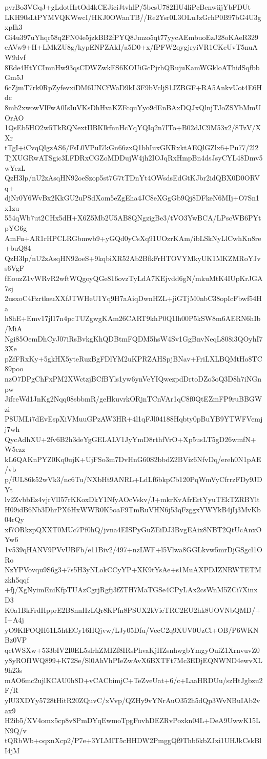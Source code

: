 pyrBo3VGqJ+gLdotHrtOd4kCEJiciJtvhlP/5besU782HU4liPcBcnwiijYbFDUt
LKH90sLtPYMVQKWwcI/HKJ0OWanTB//Re2Ysr0L3OLuJzGrhP0B97bG4U3gxpIk3
Gi4u397uYhqr58q2FN04e5jzkBB2fPYQ8Jmzo5qt77yycAEmbuoEzJ28oKAeR329
eAVw9+H+LMkZU8g/kypENPZAkI/a5D0+x/fPFW2qygjryiVR1CKeUvT5nuAW9dvf
8Ede4HtYCImnHw93qsCDWZwkFS6KOUiGcPjrhQRujuKamWGkloAThidSqfbbGm5J
6cZjmT7rk0RpZyfevxiDM6UNCfWaD9kL3F9bVcljS1JZBGF+RA5AnkvUot4E6Hdc
8mb2xwowVlFwA0IsIuVKsDhHvaKZFcquYyo9dEnBAxDQJxQlnjTJoZSYbMmUOrAO
1QsEb5HO2w5TkRQNextIIBKlkfnnHcYqYQIq2n7ITo+B02dJC9M53x2/8TzV/XXr
tTgI+iCvqQlgzAS6/FsL0VPuI7kGn66zxQ1bhIuxGKRxktAEQlGZlx6+Pu77/2l2
TjXUGRwATSgic3LFDRxCGZoMDDujW4jh2IOJqRxHmpBn4dsJsyCYL48Dmv5wYczL
QzH3lp/nU2zAsqHN92oeSzop5st7G7tTDnYt4OWsdsEdGtKJbr2idQBX0D0ORVq+
djNr0Y6WvBx2KkGU2uPSdXom5eZgEha4JC8eXGgGb9Qj8DFkeN6MIj+O7Sn1x1zu
554qWb7ut2CHx5dH+X6Z5Mb2U5AB8QNgzigBe3/tVO3YwBCA/LPscWB6PYtpYG6g
AmFu+AR1rHPCLRGbmwb9+yGQd0yCsXq91UOzrKAm/ibLSkNyLlCwhKn8re+buQ84
QzH3lp/nU2zAsqHN92oeS+9kqbiXR52Ab2BfkFrHTOVYMkyUK1MKZMRoYJvs6VgF
fEouzZ1vWRvR2wftWQgoyQGe816ovzTyLdA7KEjvdd6gN/mkuMtK4IUpKrJGA7sj
2usxoC4FzrtkeuXXfJTWHeU1Yq9H7aAiqDwnHZL+jiGTjM0nbC38opIcFbwf54Ha
h8hE+Emv17jl17n4pcTUZgwgKAm26CART9khP0Q1lh00P5kSW8m6AERN6hIb/MiA
Ngi85OemDhCyJ07iRsBvkgKhQDBtmFQDM5hsW4Sv1GgBnvNeqL808i3QOyhI73Xe
pZfFRxKy+5gkHX5yteRuzBgFDlYM2uKPRZAHSpjBNav+FriLXLBQMtHo8TC89poo
nzO7DPgChFxPM2XWctzjBCfBYls1yw6ynVeYIQwezpdDrtoDZo3oQ3D8h7iNGnpw
JifceWd1JnKg2Nqq08sbbmR/geHkuvrkORjnTCnVAr1qC8f0QtEZmFP9ruBBGWzi
P8UMLi7dEvEspXiVMuuGPzAW3HR+4l1qFJl04188Hqbty0pBuYB9YTWFVemjj7wh
QycAdhXU+2fv6B2h3deYgGELALV1JyYmD8rthfVrO+Xp5usLT5gD26wmfN+W5czz
kL6QAKnPYZ0Kq0ujK+UjFSo3m7DvHnG60S2bbdZ2BViz6NfvDq/ereh0N1pAE/vb
p/fUL86k52wVk3/nc6Tu/NXbHt9ANRL+LdLf6bkpCb120PqWmVyCfrrzFDy9JDYt
lv2ZvbbEz4vjrVlI57rKKoxDkY1NfyAOcVskv/J+mkrKvAfrErtYyuTEkTZRBYlt
H09idB6Nb3DhrPX6HxWWR0K5oaF9TmRuVHN6j53qFzggxYWYkB4jIj3MvKb04rQy
xf7ORkzpQXXT0MUc7Pf0hQ/jvna4EISPyGuZEiDJ3BvgEAix8NBT2QtUcAnxOYw6
1v539qHANV9PVvUBFb/e11Biv2/497+nzLWF+l5Vlwa8GGLkvw5mrDjGSgcl1ORo
NzYPVovqu9S6g3+7s5H3yNLokCCyYP+XK9tYsAe+s1MuAXPDJZNRWTETMzkh5qqf
+fj/XgNyimEniKfpTUAzCgrjRgfj3fZTH7MaTGSe4CPyLAx2csWnM5ZCi7XinxD3
K0a1BkFrdHpprE2B8nnHzLQr8KPfn8PSUX2kVieTRC2EU2hk8UOVNbQMD/+I+A4j
yO9KlFOQH61L5htECy16HQjvw/LJy05Dfu/VecC2q9XUV0UzCl+OB/P6WKNBz0VP
qctWSXw+533bIV2I0EL5slrhZMIZf8IRsPhvaKjHZsnhwgbYmgyOuiZ1XrnvuvZ0
y8yROf1WQ899+K72Se/Sl0AhVhPIeZwAvX6BXTFt7Mc3EDjEQNWND4ewvXL9h23s
mAO6mc2ujlKCAU0h8D+vCACbimjC+TeZveUat+6/c+LaaHRDUu/szHtJgbzu2F/R
ylU3XDYy5728tHitR20ZQuvC/xVvp/QZHy9vYNrAuO352h5dQp3WvNBuIAb2vax9
H2ib5/XV4omx5cp8v8PmDYqEwmoTpgFuvhDEZRvPoxkn04L+DeA9UwwK15LN9Q/v
tQRbWb+oqxnXcp2/P7e+3YLMIT5cHHDW2PmggQf9Thb6kbZJxi1UHJkCskBlI4jM
